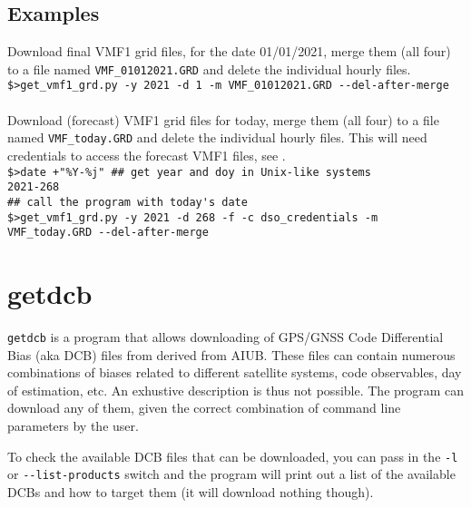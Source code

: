 \subsection{Examples}
\label{ssec:programs-get-vmf1-grd-examples}
Download final VMF1 grid files, for the date 01/01/2021, merge them (all four) to 
a file named \verb|VMF_01012021.GRD| and delete the individual hourly files.\\
\verb|$>get_vmf1_grd.py -y 2021 -d 1 -m VMF_01012021.GRD --del-after-merge|\\
\\

Download (forecast) VMF1 grid files for today, merge them (all four) to a file 
named \verb|VMF_today.GRD| and delete the individual hourly files. This will need 
credentials to access the forecast VMF1 files, see .\\
\verb|$>date +"%Y-%j" ## get year and doy in Unix-like systems|\\
\verb|2021-268|\\
\verb|## call the program with today's date|\\
\verb|$>get_vmf1_grd.py -y 2021 -d 268 -f -c dso_credentials -m VMF_today.GRD --del-after-merge|\\

\section{getdcb}
\label{sec:programs-getdcb}
\verb|getdcb| is a program that allows downloading of GPS/GNSS Code Differential 
Bias (aka DCB) files from derived from AIUB. These files can contain 
numerous combinations of biases related to different satellite systems, code observables, 
day of estimation, etc. An exhustive description is thus not possible. The program 
can download any of them, given the correct combination of command line parameters 
by the user.

To check the available DCB files that can be downloaded, you can pass in the \verb|-l| or 
\verb|--list-products| switch and the program will print out a list of the available 
DCBs and how to target them (it will download nothing though).

